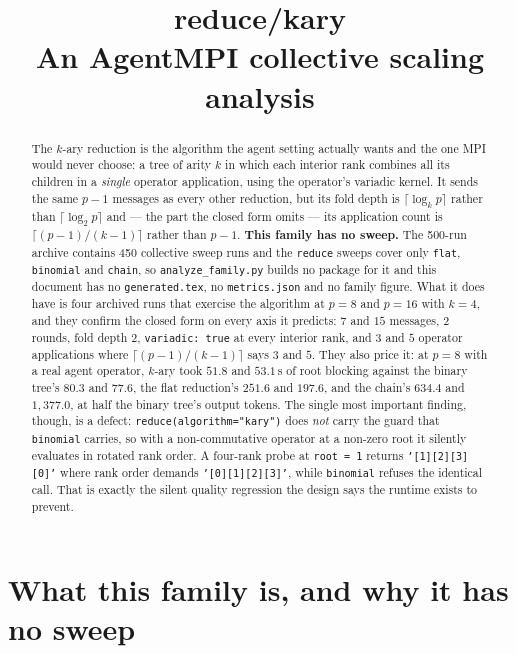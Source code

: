\documentclass[11pt]{article}
\title{\textbf{reduce/kary}\\[2pt]\large An AgentMPI collective scaling analysis}
\author{}
\date{}
\begin{document}
\maketitle

\begin{abstract}
The $k$-ary reduction is the algorithm the agent setting actually wants and the one MPI would
never choose: a tree of arity $k$ in which each interior rank combines all its children in a
\emph{single} operator application, using the operator's variadic kernel. It sends the same
$p-1$ messages as every other reduction, but its fold depth is $\lceil\log_k p\rceil$ rather
than $\lceil\log_2 p\rceil$ and --- the part the closed form omits --- its application count
is $\lceil (p-1)/(k-1) \rceil$ rather than $p-1$. \textbf{This family has no sweep.} The 500-run
archive contains 450 collective sweep runs and the \texttt{reduce} sweeps cover only
\texttt{flat}, \texttt{binomial} and \texttt{chain}, so \texttt{analyze\_family.py} builds no
package for it and this document has no \texttt{generated.tex}, no \texttt{metrics.json} and no
family figure. What it does have is four archived runs that exercise the algorithm at $p=8$ and
$p=16$ with $k=4$, and they confirm the closed form on every axis it predicts: $7$ and $15$
messages, $2$ rounds, fold depth $2$, \texttt{variadic: true} at every interior rank, and
$3$ and $5$ operator applications where $\lceil (p-1)/(k-1) \rceil$ says $3$ and $5$. They also
price it: at $p=8$ with a real agent operator, $k$-ary took $51.8$ and $53.1$\,s of root
blocking against the binary tree's $80.3$ and $77.6$, the flat reduction's $251.6$ and $197.6$,
and the chain's $634.4$ and $1{,}377.0$, at half the binary tree's output tokens. The single
most important finding, though, is a defect: \texttt{reduce(algorithm="kary")} does \emph{not}
carry the guard that \texttt{binomial} carries, so with a non-commutative operator at a
non-zero root it silently evaluates in rotated rank order. A four-rank probe at
\texttt{root = 1} returns \texttt{'[1][2][3][0]'} where rank order demands
\texttt{'[0][1][2][3]'}, while \texttt{binomial} refuses the identical call. That is exactly
the silent quality regression the design says the runtime exists to prevent.
\end{abstract}

\section{What this family is, and why it has no sweep}
\end{document}
